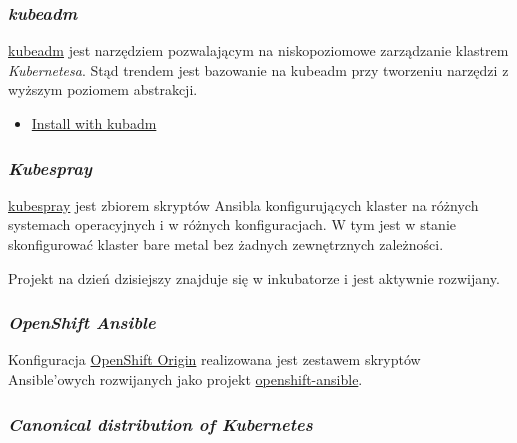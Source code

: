 \documentclass[a4paper,12pt,twoside,openany]{report}
\providecommand{\tightlist}{%
  \setlength{\itemsep}{0pt}\setlength{\parskip}{0pt}}
\begin{document}
\hypertarget{kubeadm}{%
\subsubsection{\texorpdfstring{\emph{kubeadm}}{kubeadm}}\label{kubeadm}}

\href{https://kubernetes.io/docs/reference/setup-tools/kubeadm/kubeadm/}{kubeadm}
jest narzędziem pozwalającym na niskopoziomowe zarządzanie klastrem
\emph{Kubernetesa}. Stąd trendem jest bazowanie na kubeadm przy
tworzeniu narzędzi z wyższym poziomem abstrakcji.

\begin{itemize}
\tightlist
\item
  \href{https://kubernetes.io/docs/setup/independent/install-kubeadm/}{Install
  with kubadm}
\end{itemize}

\hypertarget{kubespray}{%
\subsubsection{\texorpdfstring{\emph{Kubespray}}{Kubespray}}\label{kubespray}}

\href{https://github.com/kubernetes-incubator/kubespray}{kubespray} jest
zbiorem skryptów Ansibla konfigurujących klaster na różnych systemach
operacyjnych i w różnych konfiguracjach. W tym jest w stanie
skonfigurować klaster bare metal bez żadnych zewnętrznych zależności.

Projekt na dzień dzisiejszy znajduje się w inkubatorze i jest aktywnie
rozwijany.

\hypertarget{openshift-ansible}{%
\subsubsection{\texorpdfstring{\emph{OpenShift
Ansible}}{OpenShift Ansible}}\label{openshift-ansible}}

Konfiguracja \protect\hyperlink{openshift-origin}{OpenShift Origin}
realizowana jest zestawem skryptów Ansible'owych rozwijanych jako
projekt
\href{https://github.com/openshift/openshift-ansible}{openshift-ansible}.

\hypertarget{canonical-distribution-of-kubernetes}{%
\subsubsection{\texorpdfstring{\emph{Canonical distribution of
Kubernetes}}{Canonical distribution of Kubernetes}}\label{canonical-distribution-of-kubernetes}}
\end{document}
